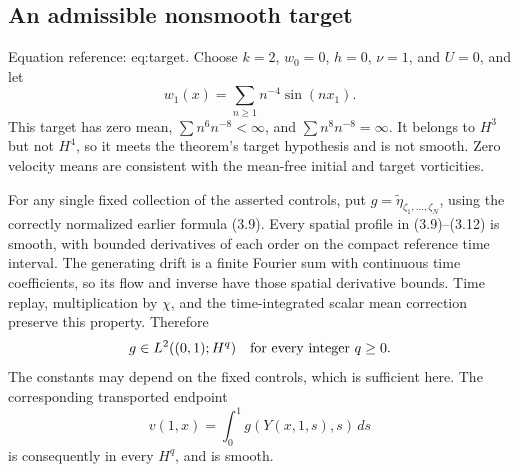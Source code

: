 \documentclass[10pt]{article}
\begin{document}
\subsection*{An admissible nonsmooth target}
Equation reference: eq:target. Choose \(k=2\), \(w_0=0\), \(h=0\), \(\nu=1\), and \(U=0\), and let \[w_1(x)=\sum_{n\ge1}n^{-4}\sin(nx_1).                        \] This target has zero mean, \(\sum n^6n^{-8}<\infty\), and \(\sum n^8n^{-8}=\infty\). It belongs to \(H^3\) but not \(H^4\), so it meets the theorem’s target hypothesis and is not smooth. Zero velocity means are consistent with the mean-free initial and target vorticities.\par
For any single fixed collection of the asserted controls, put \(g=\widetilde\eta_{\zeta_1,\ldots,\zeta_N}\), using the correctly normalized earlier formula (3.9). Every spatial profile in (3.9)–(3.12) is smooth, with bounded derivatives of each order on the compact reference time interval. The generating drift is a finite Fourier sum with continuous time coefficients, so its flow and inverse have those spatial derivative bounds. Time replay, multiplication by \(\chi\), and the time-integrated scalar mean correction preserve this property. Therefore \[g\in L^2((0,1);H^q)\quad\hbox{for every integer }q\ge0.\] The constants may depend on the fixed controls, which is sufficient here. The corresponding transported endpoint \[v(1,x)=\int_0^1g(Y(x,1,s),s)\,ds\] is consequently in every \(H^q\), and is smooth.\par
\end{document}
